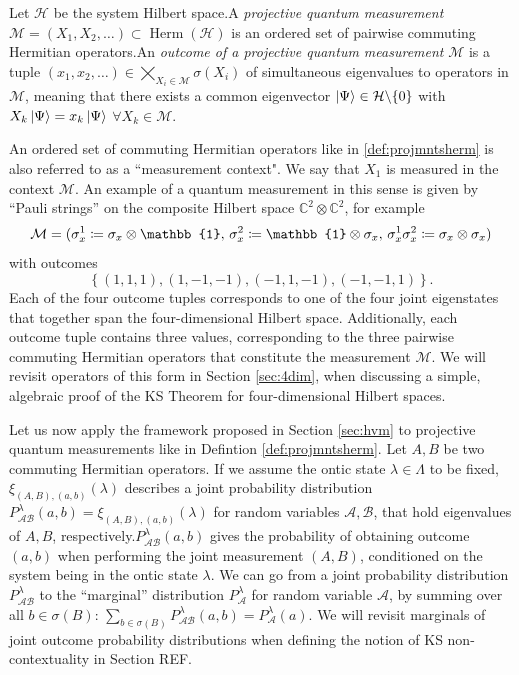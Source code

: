 \begin{definition}
\label{def:projmntsherm}
Let $\mathcal{H}$ be the system Hilbert space.\hfill\break A \emph{projective quantum measurement} $\mathcal{M}=(X_{1},X_{2},\dots)\subset\operatorname{Herm}(\mathcal{H})$ is an ordered set of pairwise commuting Hermitian operators.\hfill\break An \emph{outcome of a projective quantum measurement} $\mathcal{M}$ is a tuple\hfill\break 
$\left(x_{1},x_{2},\dots\right)\in\bigtimes_{X_{i}\in\mathcal{M}}\sigma(X_{i})$ of simultaneous eigenvalues to operators in $\mathcal{M}$, meaning that there exists a common eigenvector $\ket{\Psi} \in\mathcal{H}\backslash\{0\}$ with $X_{k}\ket{\Psi} =x_{k}\ket{\Psi}$  $\forall X_{k}\in\mathcal{M}$.
\end{definition}

An ordered set of commuting Hermitian operators like in \ref{def:projmntsherm} is also referred to as a ``measurement context". We say that $X_1$ is measured in the context $\mathcal{M}$. An example of a quantum measurement in this sense is given by “Pauli strings” on the composite Hilbert space $\mathbb{\mathbb{C}}^{2}\otimes\mathbb{C}^{2}$, for example
\begin{equation*}
\mathcal{M} =(\sigma_{x}^{1} \coloneqq \sigma_{x}\otimes
\mathbb{1},\thinspace\sigma_{x}^{2}\coloneqq\mathbb{1}\otimes\sigma_{x},\thinspace\sigma_{x}^{1}\sigma_{x}^{2}\coloneqq\sigma_{x}\otimes\sigma_{x})
\end{equation*} with outcomes
\begin{equation*}
\left\{ (1,1,1),(1,-1,-1),(-1,1,-1),(-1,-1,1)\right\}.
\end{equation*}
Each of the four outcome tuples corresponds to one of the four joint eigenstates that together span the four-dimensional Hilbert space. Additionally, each outcome tuple contains three values, corresponding to the three pairwise commuting Hermitian operators that constitute the measurement $\mathcal{M}$. We will revisit operators of this form in Section \ref{sec:4dim}, when discussing a simple, algebraic proof of the KS Theorem for four-dimensional Hilbert spaces.

Let us now apply the framework proposed in Section \ref{sec:hvm} to projective quantum measurements like in Defintion \ref{def:projmntsherm}. Let $A,B$ be two commuting Hermitian operators. If we assume the ontic state $\lambda\in\Lambda$ to be fixed, $\xi_{(A,B),(a,b)}(\lambda)$ describes a joint probability distribution $P_{\mathcal{A}\mathcal{B}}^{\lambda}(a,b)=\xi_{(A,B),(a,b)}(\lambda)$ for random variables $\mathcal{A},\mathcal{B}$, that hold eigenvalues of $A,B$, respectively.\hfill\break $P_{\mathcal{A}\mathcal{B}}^{\lambda}(a,b)$ gives the probability of obtaining outcome $(a,b)$ when performing the joint measurement $(A,B)$, conditioned on the system being in the ontic state $\lambda$. We can go from a joint probability distribution $P_{\mathcal{A}\mathcal{B}}^{\lambda}$ to the “marginal” distribution $P_{\mathcal{A}}^{\lambda}$ for random variable $\mathcal{A}$, by summing over all $b\in\sigma(B)$: $\sum_{b\in\sigma(B)}P_{\mathcal{A}\mathcal{B}}^{\lambda}(a,b)=P_{\mathcal{A}}^{\lambda}(a)$. We will revisit marginals of joint outcome probability distributions when defining the notion of KS non-contextuality in Section REF.

